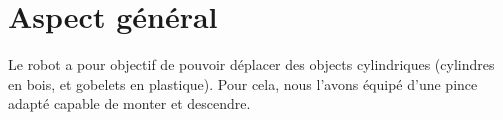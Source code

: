 \chapter{Aspect général}
Le robot a pour objectif de pouvoir déplacer des objects cylindriques (cylindres en bois, et gobelets en plastique). Pour cela, nous l'avons équipé d'une pince adapté capable de monter et descendre.


\begin{figure}[h]
	\centering

	\begin{floatrow}
    \end{floatrow}
\end{figure}


